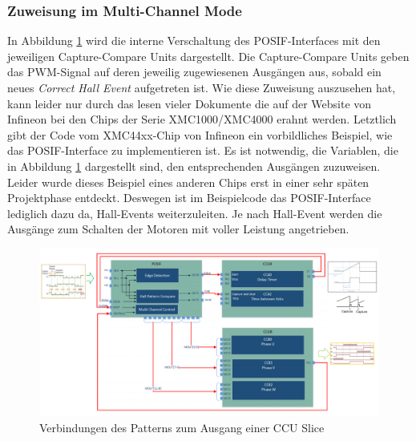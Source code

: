 \subsubsection{Zuweisung im Multi-Channel Mode}
In Abbildung \ref{fig:interconnects} wird die interne Verschaltung des POSIF-Interfaces mit den jeweiligen Capture-Compare Units dargestellt. Die Capture-Compare Units geben das PWM-Signal auf deren jeweilig zugewiesenen Ausgängen aus, sobald ein neues \emph{Correct Hall Event} aufgetreten ist. Wie diese Zuweisung auszusehen hat, kann leider nur durch das lesen vieler Dokumente die auf der Website von Infineon bei den Chips der Serie XMC1000/XMC4000 erahnt werden. Letztlich gibt der Code vom XMC44xx-Chip von Infineon ein vorbildliches Beispiel, wie das POSIF-Interface zu implementieren ist. Es ist notwendig, die Variablen, die in Abbildung \ref{fig:interconnects} dargestellt sind, den entsprechenden Ausgängen zuzuweisen. Leider wurde dieses Beispiel eines anderen Chips erst in einer sehr späten Projektphase entdeckt. Deswegen ist im Beispielcode das POSIF-Interface lediglich dazu da, Hall-Events weiterzuleiten. Je nach Hall-Event werden die Ausgänge zum Schalten der Motoren mit voller Leistung angetrieben.
\begin{figure}
    \includegraphics[width=\textwidth]{motor/interconnects}
    \caption{Verbindungen des Patterns zum Ausgang einer CCU Slice}
    \label{fig:interconnects}
\end{figure}

